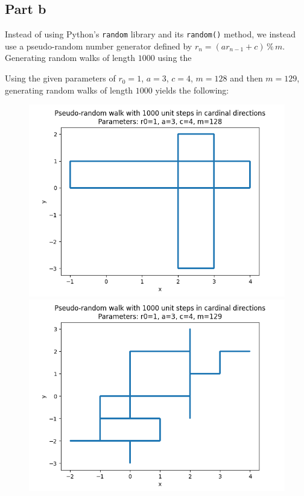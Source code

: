 \documentclass[a4paper,12pt]{article}
\begin{document}
\begin{figure}[!ht]
\end{figure}

\subsection*{Part b}

Instead of using Python's \texttt{random} library and its \texttt{random()} method, we instead use a pseudo-random
number generator defined by $r_n = (a r_{n - 1} + c)\, \%\, m$. Generating random walks of length $1000$ using the

Using the given parameters of $r_0 = 1$, $a = 3$,
$c = 4$, $m = 128$ and then $m = 129$, generating random walks of length $1000$ yields the following:

\begin{figure}[!ht]
  \centering
  \begin{minipage}{0.48\textwidth}
    \includegraphics[width=\textwidth]{img/2_1b_pseudo_m128.png}
  \end{minipage}
  \begin{minipage}{0.48\textwidth}
    \includegraphics[width=\textwidth]{img/2_1b_pseudo_m129.png}
  \end{minipage}
\end{figure}
\end{document}

